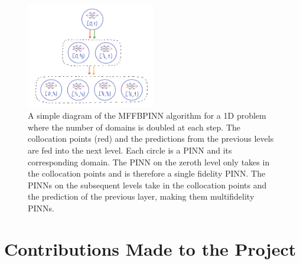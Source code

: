 \documentclass[12pt]{article}
\begin{document}
\begin{figure}
\centering
\includegraphics[width=0.5\textwidth]{imgs/mffbpinns4}
\caption{A simple diagram of the MFFBPINN algorithm for a 1D problem where the number of domains is doubled at each step. The collocation points (red) and the predictions from the previous levels are fed into the next level. Each circle is a PINN and its corresponding domain. The PINN on the zeroth level only takes in the collocation points and is therefore a single fidelity PINN. The PINNs on the subsequent levels take in the collocation points and the prediction of the previous layer, making them multifidelity PINNs.}
\label{fig:mffbpinn}
\end{figure}

\section{Contributions Made to the Project}
\end{document}
